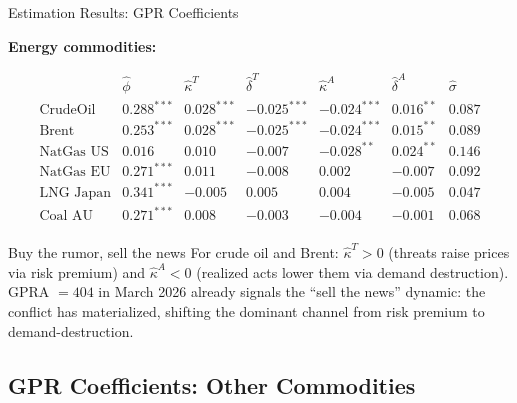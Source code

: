 ﻿\documentclass[aspectratio=1610]{beamer}
\begin{document}
\begin{frame}[shrink=10]{Estimation Results: GPR Coefficients}

  \textbf{Energy commodities:}

  \[
    \begin{array}{lcccccc}
      
       & \hat{\phi} & \hat{\kappa}^T & \hat{\delta}^T & \hat{\kappa}^A & \hat{\delta}^A & \hat{\sigma} \\
    \text{CrudeOil} & 0.288^{***} & 0.028^{***} & -0.025^{***} & -0.024^{***} & 0.016^{**}  & 0.087 \\
      \text{Brent}    & 0.253^{***} & 0.028^{***} & -0.025^{***} & -0.024^{***} & 0.015^{**}  & 0.089 \\
      \text{NatGas US}& 0.016       & 0.010       & -0.007       & -0.028^{**}  & 0.024^{**}  & 0.146 \\
      \text{NatGas EU}& 0.271^{***} & 0.011       & -0.008       &  0.002       & -0.007      & 0.092 \\
      \text{LNG Japan}& 0.341^{***} & -0.005      &  0.005       &  0.004       & -0.005      & 0.047 \\
      \text{Coal AU}  & 0.271^{***} &  0.008      & -0.003       & -0.004       & -0.001      & 0.068 \\
    \end{array}
  \]

  \medskip
  
\begin{alertblock}{Buy the rumor, sell the news}
For crude oil and Brent: $\hat{\kappa}^T > 0$ (threats raise prices via
risk premium) and $\hat{\kappa}^A < 0$ (realized acts lower them via demand
destruction). GPRA $= 404$ in March 2026 already signals the ``sell the news''
dynamic: the conflict has materialized, shifting the dominant channel from
risk premium to demand-destruction.
\end{alertblock}
\end{frame}

\subsection{GPR Coefficients: Other Commodities}
\end{document}
